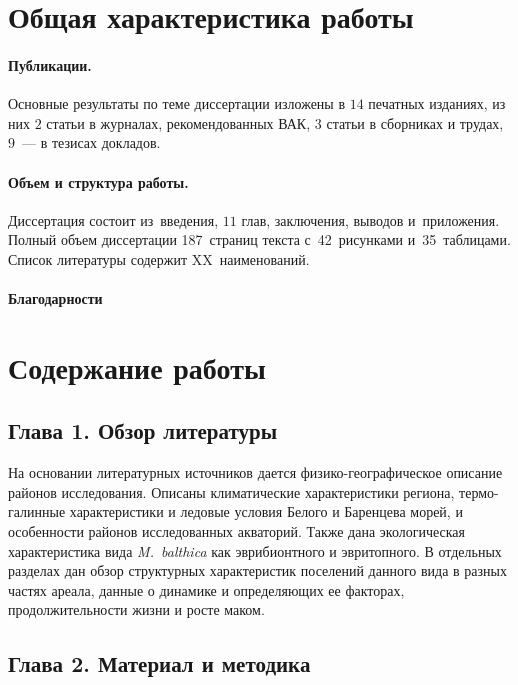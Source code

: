 \section*{Общая характеристика работы}



\paragraph{Публикации.} Основные результаты по теме диссертации изложены в $14$ печатных изданиях, из них $2$ статьи в журналах, рекомендованных ВАК, $3$ статьи в сборниках и трудах, $9$~--- в тезисах докладов.

\paragraph{Объем и структура работы.} Диссертация состоит из~введения, $11$ глав, заключения, выводов и~приложения. Полный объем диссертации 187~страниц текста с~42~рисунками и~35~таблицами. Список литературы содержит XX~наименований.

\paragraph{Благодарности}
\begin{small}

\end{small}

\section*{Содержание работы}

\subsection*{Глава 1. Обзор литературы}
На основании литературных источников дается физико-географическое описание районов исследования.
Описаны климатические характеристики региона, термо-галинные характеристики и ледовые условия Белого и Баренцева морей, и особенности районов исследованных акваторий.
Также дана экологическая характеристика вида \textit{M.~balthica} как эврибионтного и эвритопного.
В отдельных разделах дан обзор структурных характеристик поселений данного вида в разных частях ареала, данные о динамике и определяющих ее факторах, продолжительности жизни и росте маком.


\subsection*{Глава 2. Материал и методика}

